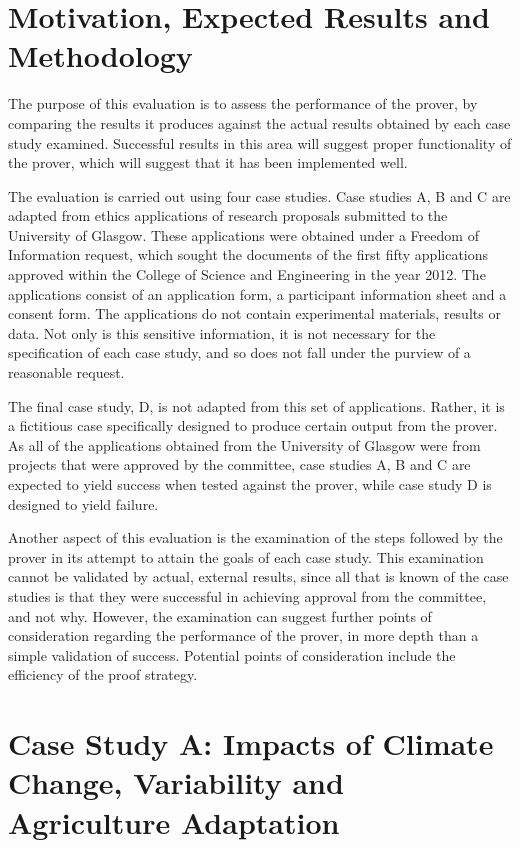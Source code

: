 \documentclass{l4proj}
\begin{document}
\section{Motivation, Expected Results and Methodology}
The purpose of this evaluation is to assess the performance of the prover, by comparing the results it produces against the actual results obtained by each case study examined. Successful results in this area will suggest proper functionality of the prover, which will suggest that it has been implemented well. 

The evaluation is carried out using four case studies. Case studies A, B and C are adapted from ethics applications of research proposals submitted to the University of Glasgow. These applications were obtained under a Freedom of Information request, which sought the documents of the first fifty applications approved within the College of Science and Engineering in the year 2012. The applications consist of an application form, a participant information sheet and a consent form. The applications do not contain experimental materials, results or data. Not only is this sensitive information, it is not necessary for the specification of each case study, and so does not fall under the purview of a reasonable request. 

The final case study, D, is not adapted from this set of applications. Rather, it is a fictitious case specifically designed to produce certain output from the prover. As all of the applications obtained from the University of Glasgow were from projects that were approved by the committee, case studies A, B and C are expected to yield success when tested against the prover, while case study D is designed to yield failure. 

Another aspect of this evaluation is the examination of the steps followed by the prover in its attempt to attain the goals of each case study. This examination cannot be validated by actual, external results, since all that is known of the case studies is that they were successful in achieving approval from the committee, and not why. However, the examination can suggest further points of consideration regarding the performance of the prover, in more depth than a simple validation of success. Potential points of consideration include the efficiency of the proof strategy. 


\section{Case Study A: Impacts of Climate Change, Variability and Agriculture Adaptation}
\end{document}
